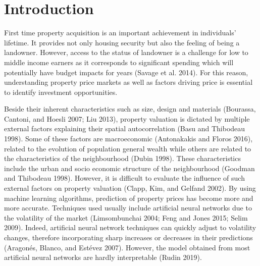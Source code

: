 \documentclass[conference,final,]{IEEEtran}
\begin{document}
%
\IEEEpeerreviewmaketitle











\hypertarget{introduction}{%
\section{Introduction}\label{introduction}}

First time property acquisition is an important achievement in individuals' lifetime. It provides not only housing security but also the feeling of being a landowner. However, access to the status of landowner is a challenge for low to middle income earners as it corresponds to significant spending which will potentially have budget impacts for years (Savage et al. 2014). For this reason, understanding property price markets as well as factors driving price is essential to identify investment opportunities.

Beside their inherent characteristics such as size, design and materials (Bourassa, Cantoni, and Hoesli 2007; Liu 2013), property valuation is dictated by multiple external factors explaining their spatial autocorrelation (Basu and Thibodeau 1998). Some of these factors are macroeconomic (Antonakakis and Floros 2016), related to the evolution of population general wealth while others are related to the characteristics of the neighbourhood (Dubin 1998). These characteristics include the urban and socio economic structure of the neighbourhood (Goodman and Thibodeau 1998). However, it is difficult to evaluate the influence of such external factors on property valuation (Clapp, Kim, and Gelfand 2002). By using machine learning algorithms, prediction of property prices has become more and more accurate. Techniques used usually include artificial neural networks due to the volatility of the market (Limsombunchai 2004; Feng and Jones 2015; Selim 2009). Indeed, artificial neural network techniques can quickly adjust to volatility changes, therefore incorporating sharp increases or decreases in their predictions (Aragonés, Blanco, and Estévez 2007). However, the model obtained from most artificial neural networks are hardly interpretable (Rudin 2019).
\end{document}
